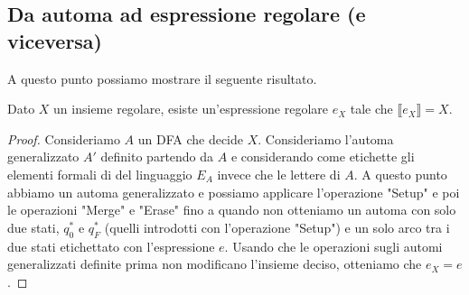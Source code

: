\subsection{Da automa ad espressione regolare (e viceversa)}
A questo punto
possiamo mostrare il seguente risultato.
\begin{prop}
    Dato $X$ un insieme regolare, 
    esiste un'espressione regolare 
    $e_X$ tale che
    $\llbracket e_X \rrbracket = X$.
    \begin{proof}
        Consideriamo $A$ un DFA che decide $X$.
        Consideriamo l'automa generalizzato $A'$ definito partendo da $A$
        e considerando come etichette gli elementi formali di 
        del linguaggio $E_A$ invece che le lettere di $A$.
        A questo punto abbiamo un automa generalizzato e possiamo applicare l'operazione "Setup"
        e poi le operazioni "Merge" e "Erase"
        fino a quando non otteniamo un automa con solo due stati, $q_0^*$ e $q_F^*$
        (quelli introdotti con l'operazione "Setup") e un solo arco tra i due stati etichettato 
        con l'espressione $e$.
        Usando che le operazioni sugli automi generalizzati definite prima non modificano l'insieme deciso,
        otteniamo che $e_X=e$.
    \end{proof}
\end{prop}
